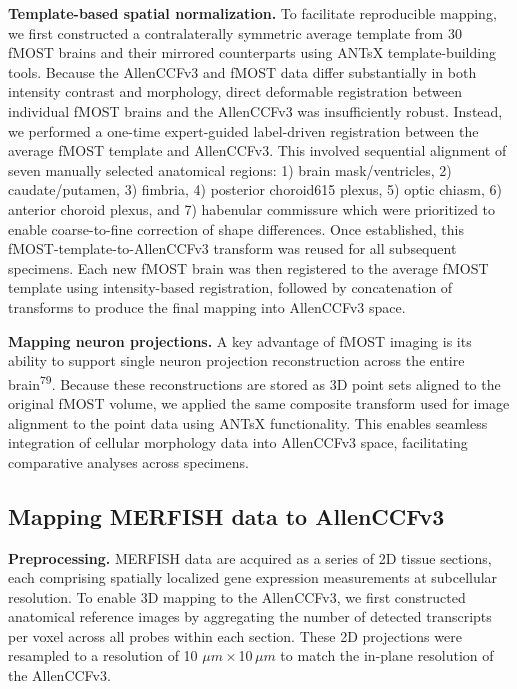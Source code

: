 \documentclass[
  12pt,
]{article}
\begin{document}
\textbf{Template-based spatial normalization.} To facilitate
reproducible mapping, we first constructed a contralaterally symmetric
average template from 30 fMOST brains and their mirrored counterparts
using ANTsX template-building tools. Because the AllenCCFv3 and fMOST
data differ substantially in both intensity contrast and morphology,
direct deformable registration between individual fMOST brains and the
AllenCCFv3 was insufficiently robust. Instead, we performed a one-time
expert-guided label-driven registration between the average fMOST
template and AllenCCFv3. This involved sequential alignment of seven
manually selected anatomical regions: 1) brain mask/ventricles, 2)
caudate/putamen, 3) fimbria, 4) posterior choroid615 plexus, 5) optic
chiasm, 6) anterior choroid plexus, and 7) habenular commissure which
were prioritized to enable coarse-to-fine correction of shape
differences. Once established, this fMOST-template-to-AllenCCFv3
transform was reused for all subsequent specimens. Each new fMOST brain
was then registered to the average fMOST template using intensity-based
registration, followed by concatenation of transforms to produce the
final mapping into AllenCCFv3 space.

\textbf{Mapping neuron projections.} A key advantage of fMOST imaging is
its ability to support single neuron projection reconstruction across
the entire brain\textsuperscript{79}. Because these reconstructions are
stored as 3D point sets aligned to the original fMOST volume, we applied
the same composite transform used for image alignment to the point data
using ANTsX functionality. This enables seamless integration of cellular
morphology data into AllenCCFv3 space, facilitating comparative analyses
across specimens.

\subsection{Mapping MERFISH data to
AllenCCFv3}\label{mapping-merfish-data-to-allenccfv3}

\textbf{Preprocessing.} MERFISH data are acquired as a series of 2D
tissue sections, each comprising spatially localized gene expression
measurements at subcellular resolution. To enable 3D mapping to the
AllenCCFv3, we first constructed anatomical reference images by
aggregating the number of detected transcripts per voxel across all
probes within each section. These 2D projections were resampled to a
resolution of 10 \(\mu m\)\,\(\times\)\,10\,\(\mu m\) to match the
in-plane resolution of the AllenCCFv3.
\end{document}
